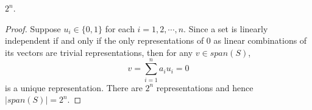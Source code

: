 \begin{Exercise}
	\begin{answer}
		$2^n$.
	\end{answer}
	\begin{proof}
		Suppose $u_i\in \{0,1\}$ for each $i=1,2,\cdots,n$. Since a set is linearly independent if and only if the only representations of $0$ as linear combinations of its vectors are trivial representations, then for any $v\in span(S)$,
		$$
		v = \sum_{i=1}^{n}a_i u_i = 0
		$$
		is a unique representation. There are $2^n$ representations and hence $\left|span(S)\right| = 2^n$.
	\end{proof}
\end{Exercise}